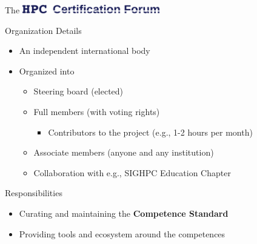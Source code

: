 \documentclass[compress,aspectratio=169]{beamer}
\begin{document}
\begin{frame}{The \includegraphics[width=0.45\textwidth]{hpccf-full}}

	\begin{block}{Organization Details}
		\begin{itemize}
			\item An independent international body
			\item Organized into
				\begin{itemize}
					\item Steering board (elected)
					\item Full members (with voting rights)
            \begin{itemize}
              \item Contributors to the project (e.g., 1-2 hours per month)
            \end{itemize}
					\item Associate members (anyone and any institution)
          \item Collaboration with e.g., SIGHPC Education Chapter
				\end{itemize}
		\end{itemize}
	\end{block}

	\begin{block}{Responsibilities}
		\begin{itemize}
			\item Curating and maintaining the \textbf{Competence Standard}
			\item Providing tools and ecosystem around the competences
		\end{itemize}
	\end{block}
\end{frame}
\end{document}
